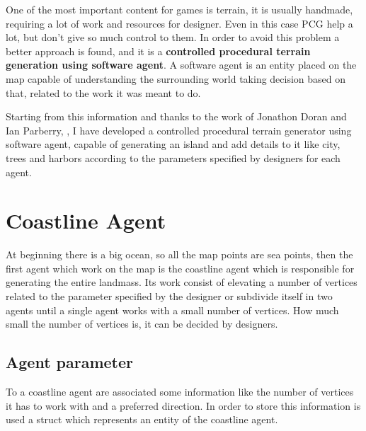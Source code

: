\documentclass[12pt]{article}
\begin{document}
    One of the most important content for games is terrain, it is usually handmade, requiring a lot of work and resources for designer. Even in this case PCG help
    a lot, but don't give so much control to them. In order to avoid this problem a better approach is found, and it is a \textbf{controlled procedural terrain generation
    using software agent}. A software agent is an entity placed on the map capable of understanding the surrounding world taking decision based on that, related to
    the work it was meant to do.

    Starting from this information and thanks to the work of Jonathon Doran and Ian Parberry, \cite{article}, I have developed a controlled procedural terrain generator using software 
    agent, capable of generating an island and add details to it like city, trees and harbors according to the parameters specified by designers for each agent.

    \newpage

    \section{Coastline Agent}
    At beginning there is a big ocean, so all the map points are sea points, then the first agent which work on the map is the coastline agent which is responsible for 
    generating the entire landmass. Its work consist of elevating a number of vertices related to the parameter specified by the designer or subdivide itself in two agents
    until a single agent works with a small number of vertices. How much small the number of vertices is, it can be decided by designers.

    \subsection{Agent parameter}
    To a coastline agent are associated some information like the number of vertices it has to work with and a preferred direction. In order to store this information is used
    a struct which represents an entity of the coastline agent. 
\end{document}

